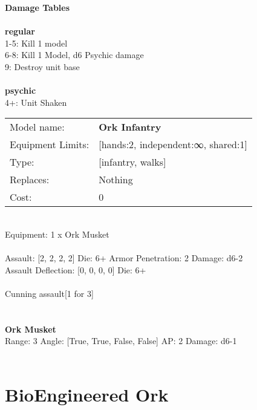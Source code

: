 {\bf Damage Tables} \\
\ \\ {\bf regular } \\
1-5: Kill 1 model \\
6-8: Kill 1 Model, d6 Psychic damage \\
9: Destroy unit base \\
\ \\ {\bf psychic } \\
4+: Unit Shaken \\


\noindent
\begin{tabular}{ll}
Model name: &{\bf Ork Infantry } \\
Equipment Limits: &[hands:2, independent:∞, shared:1] \\
Type: &[infantry, walks] \\
Replaces: &Nothing \\
Cost: & 0\\
\end{tabular}
\ \\
Equipment: 1 x Ork Musket \\
\ \\
Assault: [2, 2, 2, 2] Die: 6+ Armor Penetration: 2 Damage: d6-2 \\
Assault Deflection: [0, 0, 0, 0] Die: 6+\\
\\ 
Cunning assault[1 for 3]\\ 
 
\ \\

\ \\
{\bf Ork Musket } \\



Range: 3  Angle: [True, True, False, False] AP: 2 Damage: d6-1 \\




 
\ \\













\clearpage

\section{ BioEngineered Ork }

